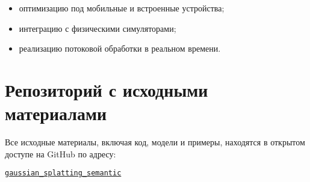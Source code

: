 \begin{itemize}
    \item оптимизацию под мобильные и встроенные устройства;
    \item интеграцию с физическими симуляторами;
    \item реализацию потоковой обработки в реальном времени.
\end{itemize}

\vspace{1em}
\section*{Репозиторий с исходными материалами}

Все исходные материалы, включая код, модели и примеры, находятся в открытом доступе на GitHub по адресу:
\begin{center}
  \href{https://github.com/SikioN/gaussian_splatting}{\texttt{gaussian\_splatting\_semantic}}
\end{center}

